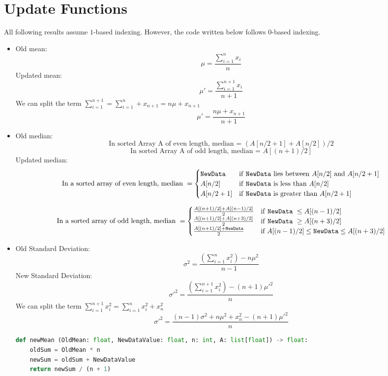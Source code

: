 \section{Update Functions}
All following results assume $1$-based indexing. However, the code written below follows $0$-based indexing.
\begin{itemize}
	\item Old mean:
	      \[
		      \mu = \frac{\sum_{i = 1}^{n} x_i}{n}
	      \]
	      Updated mean:
	      \[
		      \mu' = \frac{\sum_{i = 1}^{n + 1} x_i}{n + 1}
	      \]
	      We can split the term $\sum_{i = 1}^{n + 1} = \sum_{i = 1}^{n} + x_{n + 1} = n\mu + x_{n+1}$
	      \[
		      \mu' = \frac{n\mu + x_{n+1}}{n+1}
	      \]
	\item Old median:
	      \[
		      \text{In sorted Array A of even length, median = } (A[n/2 + 1] + A[n/2]) / 2
	      \]
	      \[
		      \text{In sorted Array A of odd length, median = } A[(n+1)/2]
	      \]
	      Updated median:
	      \[
		      \text{In a sorted array of even length, median } =
		      \begin{cases}
			      \text{\texttt{NewData}} & \text{if \texttt{NewData} lies between } A[n/2] \text{ and } A[n/2 + 1] \\
			      A[n/2]                  & \text{if \texttt{NewData} is less than } A[n/2]                         \\
			      A[n/2 + 1]              & \text{if \texttt{NewData} is greater than } A[n/2 + 1]
		      \end{cases}
	      \]

	      \[
		      \text{In a sorted array of odd length, median } =
		      \begin{cases}
			      \frac{A[(n+1)/2] + A[(n-1)/2]}{2}              & \text{if \texttt{NewData} } \leq A[(n-1)/2]                        \\
			      \frac{A[(n+1)/2] + A[(n+3)/2]}{2}              & \text{if \texttt{NewData} } \geq A[(n+3)/2]                        \\
			      \frac{A[(n+1)/2] + \text{\texttt{NewData}}}{2} & \text{if } A[(n-1)/2] \leq \text{\texttt{NewData}} \leq A[(n+3)/2]
		      \end{cases}
	      \]
	\item Old Standard Deviation:
	      \[
		      \sigma^2 = \frac{(\sum_{i = 1}^{n} x_i^2) - n\mu^2}{n - 1}
	      \]
	      New Standard Deviation:
	      \[
		      \sigma'^2 = \frac{(\sum_{i = 1}^{n+1} x_i^2) - (n+1)\mu'^2}{n}
	      \]
	      We can split the term $\sum_{i = 1}^{n + 1}x_i^2 = \sum_{i = 1}^{n}x_i^2 + x_n^2$
	      \[
		      \sigma'^2 = \frac{(n - 1)\sigma^2 + n\mu^2 + x_n^2 - (n + 1)\mu'^2}{n}
	      \]
	      \begin{lstlisting}[language=Python, caption={Python code to calculate new Mean, Median and Standard deviation}]
def newMean (OldMean: float, NewDataValue: float, n: int, A: list[float]) -> float:
    oldSum = OldMean * n
    newSum = oldSum + NewDataValue
    return newSum / (n + 1)


\end{lstlisting}
\end{itemize}
